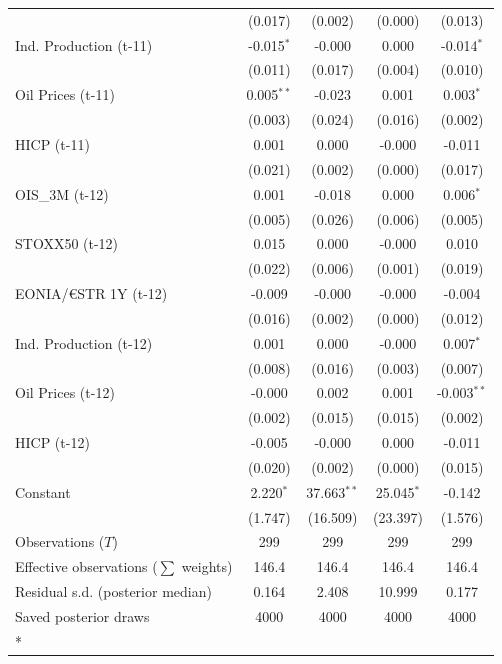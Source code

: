 \begin{longtable}[t]{lcccc}
 & (0.017) & (0.002) & (0.000) & (0.013)\\
Ind. Production (t-11) & -0.015$^{*}$ & -0.000 & 0.000 & -0.014$^{*}$\\
 & (0.011) & (0.017) & (0.004) & (0.010)\\
Oil Prices (t-11) & 0.005$^{**}$ & -0.023 & 0.001 & 0.003$^{*}$\\
 & (0.003) & (0.024) & (0.016) & (0.002)\\
HICP (t-11) & 0.001 & 0.000 & -0.000 & -0.011\\
 & (0.021) & (0.002) & (0.000) & (0.017)\\
OIS\_3M (t-12) & 0.001 & -0.018 & 0.000 & 0.006$^{*}$\\
 & (0.005) & (0.026) & (0.006) & (0.005)\\
STOXX50 (t-12) & 0.015 & 0.000 & -0.000 & 0.010\\
 & (0.022) & (0.006) & (0.001) & (0.019)\\
EONIA/€STR 1Y (t-12) & -0.009 & -0.000 & -0.000 & -0.004\\
 & (0.016) & (0.002) & (0.000) & (0.012)\\
Ind. Production (t-12) & 0.001 & 0.000 & -0.000 & 0.007$^{*}$\\
 & (0.008) & (0.016) & (0.003) & (0.007)\\
Oil Prices (t-12) & -0.000 & 0.002 & 0.001 & -0.003$^{**}$\\
 & (0.002) & (0.015) & (0.015) & (0.002)\\
HICP (t-12) & -0.005 & -0.000 & 0.000 & -0.011\\
 & (0.020) & (0.002) & (0.000) & (0.015)\\
Constant & 2.220$^{*}$ & 37.663$^{**}$ & 25.045$^{*}$ & -0.142\\
 & (1.747) & (16.509) & (23.397) & (1.576)\\
\midrule
Observations ($T$) & 299 & 299 & 299 & 299\\
Effective observations ($\sum$ weights) & 146.4 & 146.4 & 146.4 & 146.4\\
Residual s.d. (posterior median) & 0.164 & 2.408 & 10.999 & 0.177\\
Saved posterior draws & 4000 & 4000 & 4000 & 4000\\*
\end{longtable}
\endgroup{}

\begingroup\fontsize{7}{9}\selectfont

